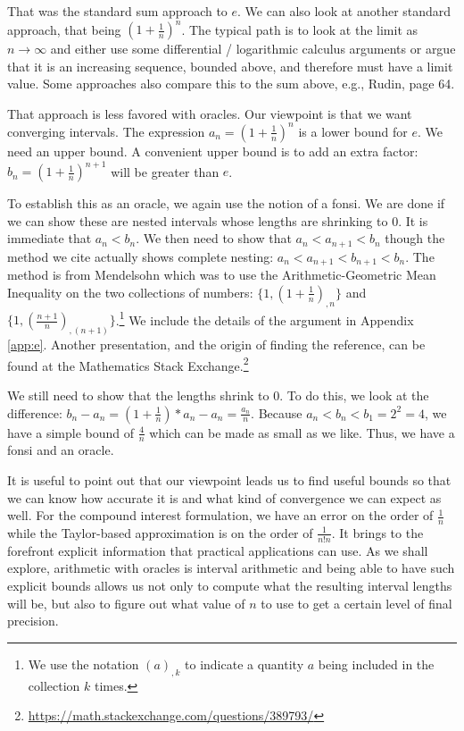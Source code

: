 \documentclass[12pt]{article}
\theoremstyle{remark}
\begin{document}
That was the standard sum approach to $e$. We can also look at another standard approach, that being $(1+\frac{1}{n})^n$. The typical path is to look at the limit as $n\to \infty$ and either use some differential / logarithmic calculus arguments or argue that it is an increasing sequence, bounded above, and therefore must have a limit value. Some approaches also compare this to the sum above, e.g., Rudin\cite{rudin}, page 64. 

That approach is less favored with oracles. Our viewpoint is that we want converging intervals. The expression $a_n = (1+\frac{1}{n})^n$ is a lower bound for $e$. We need an upper bound. A convenient upper bound is to add an extra factor: $b_n = (1+\frac{1}{n})^{n+1}$ will be greater than $e$. 

To establish this as an oracle, we again use the notion of a fonsi. We are done if we can show these are nested intervals whose lengths are shrinking to 0. It is immediate that $a_n < b_n$. We then need to show that $a_n < a_{n+1} < b_n$ though the method we cite actually shows complete nesting: $a_n < a_{n+1} < b_{n+1} < b_n$. The method is from Mendelsohn \cite{mend} which was to use the Arithmetic-Geometric Mean Inequality on the two collections of numbers: $\{1, (1+ \frac{1}{n})_{,n} \}$ and $\{1, (\frac{n+1}{n})_{,(n+1)}\}$.\footnote{We use the notation $(a)_{,k}$ to indicate a quantity $a$ being included in the collection $k$ times.} We include the details of the argument in Appendix \ref{app:e}.  Another presentation, and the origin of finding the reference, can be found at the Mathematics Stack Exchange.\footnote{ \url{https://math.stackexchange.com/questions/389793/}}

We still need to show that the lengths shrink to 0. To do this, we look at the difference: $b_n - a_n = (1+\tfrac{1}{n})*a_n - a_n = \tfrac{a_n}{n}$. Because $a_n < b_n < b_1=2^2 = 4$, we have a simple bound of $\tfrac{4}{n}$ which can be made as small as we like. Thus, we have a fonsi and an oracle. 

It is useful to point out that our viewpoint leads us to find useful bounds so that we can know how accurate it is and what kind of convergence we can expect as well. For the compound interest formulation, we have an error on the order of $\frac{1}{n}$ while the Taylor-based approximation is on the order of $\frac{1}{n! n}$. It brings to the forefront explicit information that practical applications can use. As we shall explore, arithmetic with oracles is interval arithmetic and being able to have such explicit bounds allows us not only to compute what the resulting interval lengths will be, but also to figure out what value of $n$ to use to get a certain level of final precision. 
\end{document}

